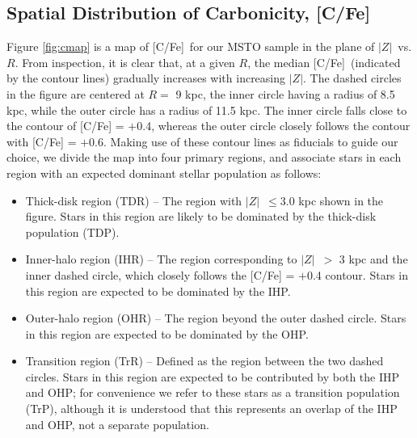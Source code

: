 \documentclass[iop]{emulateapj}
\newcommand*{\cfe}{[C/Fe]}
\newcommand*{\z}{$|Z|$}
\begin{document}
\subsection{Spatial Distribution of Carbonicity, [C/Fe]}

Figure \ref{fig:cmap} is a map of \cfe\ for our MSTO sample in the plane 
of \z\ vs. $R$. From inspection, it is clear that, at
a given $R$, the median \cfe\ (indicated by the contour lines) gradually
increases with increasing \z. The dashed circles in the figure are
centered at $R=$ 9 kpc, the inner circle having a radius of 8.5 kpc,
while the outer circle has a radius of 11.5 kpc. The inner circle falls
close to the contour of [C/Fe] = $+$0.4, whereas the outer circle
closely follows the contour with [C/Fe] = $+$0.6. Making use of these
contour lines as fiducials to guide our choice, we divide the map into
four primary regions, and associate stars in each region with an
expected dominant stellar population as follows:

\begin{itemize}

\item Thick-disk region (TDR) -- The region
with \z\ $\leq 3.0$ kpc shown in the figure. Stars in this region
are likely to be dominated by the thick-disk population (TDP).

\item Inner-halo region (IHR) -- The region corresponding to
\z\ $>$ 3 kpc and the inner dashed circle, which closely follows the [C/Fe] = $+$0.4 contour.
Stars in this region are expected to be dominated by the IHP.

\item Outer-halo region (OHR) -- The region beyond the outer dashed
circle. Stars in this region are expected to be dominated by the OHP.

\item Transition region (TrR) -- Defined as the region between the two
dashed circles. Stars in this region are expected to be contributed by
both the IHP and OHP; for convenience we refer to these stars as a
transition population (TrP), although it is understood that this
represents an overlap of the IHP and OHP, not a separate population.

\end{itemize}
\end{document}
